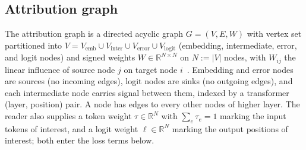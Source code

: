     \subsection{Attribution graph}
    The attribution graph is a directed acyclic graph $G = (V, E, W)$ with
    vertex set partitioned into
    $V = V_{\text{emb}} \cup V_{\text{inter}} \cup V_{\text{error}} \cup V_{\text{logit}}$
    (embedding, intermediate, error, and logit nodes) and signed weights
    $W \in \mathbb{R}^{N \times N}$ on $N := |V|$ nodes, with $W_{ij}$ the
    linear influence of source node $j$ on target node $i$~\citep{ameisen2024scaling}.
    Embedding and error nodes are sources (no incoming edges), logit nodes
    are sinks (no outgoing edges), and each intermediate node carries signal
    between them, indexed by a transformer (layer, position) pair. A node has edges to every other nodes of higher layer.
    The reader also supplies a token weight $\tau \in \mathbb{R}^N$ with
    $\sum_e \tau_e = 1$ marking the input tokens of interest, and a logit
    weight $\ell \in \mathbb{R}^N$ marking the output positions of interest;
    both enter the loss terms below.


